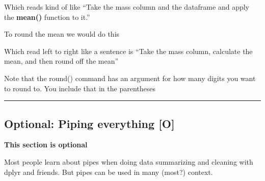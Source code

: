 \documentclass[]{book}
\newenvironment{Shaded}{\begin{snugshade}}{\end{snugshade}}
\newcommand{\KeywordTok}[1]{\textcolor[rgb]{0.13,0.29,0.53}{\textbf{#1}}}
\newcommand{\DataTypeTok}[1]{\textcolor[rgb]{0.13,0.29,0.53}{#1}}
\newcommand{\DecValTok}[1]{\textcolor[rgb]{0.00,0.00,0.81}{#1}}
\newcommand{\StringTok}[1]{\textcolor[rgb]{0.31,0.60,0.02}{#1}}
\newcommand{\CommentTok}[1]{\textcolor[rgb]{0.56,0.35,0.01}{\textit{#1}}}
\newcommand{\OperatorTok}[1]{\textcolor[rgb]{0.81,0.36,0.00}{\textbf{#1}}}
\newcommand{\NormalTok}[1]{#1}
\theoremstyle{definition}
\theoremstyle{definition}
\theoremstyle{definition}
\theoremstyle{remark}
\begin{document}
\begin{Shaded}
\end{Shaded}

Which reads kind of like ``Take the mass column and the dataframe and
apply the \textbf{mean()} function to it.''

To round the mean we would do this

\begin{Shaded}
\end{Shaded}

Which read left to right like a sentence is ``Take the mass column,
calculate the mean, and then round off the mean''

Note that the round() command has an argument for how many digits you
want to round to. You include that in the parentheses

\begin{Shaded}
\end{Shaded}

\begin{center}\rule{0.5\linewidth}{\linethickness}\end{center}

\subsection{Optional: Piping everything
{[}O{]}}\label{optional-piping-everything-o}

\textbf{This section is optional}

Most people learn about pipes when doing data summarizing and cleaning
with dplyr and friends. But pipes can be used in many (most?) context.
\end{document}
